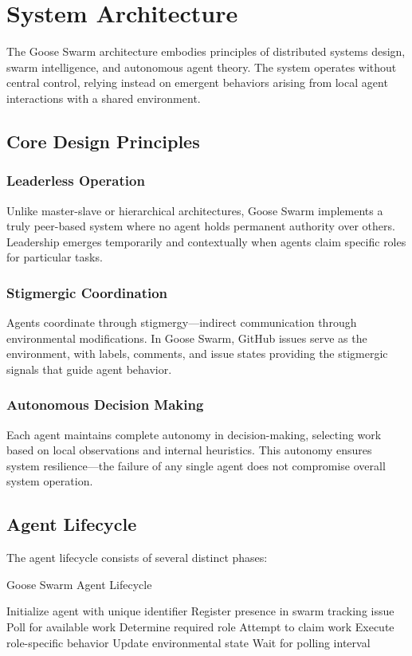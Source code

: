 \documentclass[11pt,a4paper]{article}
\begin{document}
\section{System Architecture}

The Goose Swarm architecture embodies principles of distributed systems design, swarm intelligence, and autonomous agent theory. The system operates without central control, relying instead on emergent behaviors arising from local agent interactions with a shared environment.

\subsection{Core Design Principles}

\subsubsection{Leaderless Operation}
Unlike master-slave or hierarchical architectures, Goose Swarm implements a truly peer-based system where no agent holds permanent authority over others. Leadership emerges temporarily and contextually when agents claim specific roles for particular tasks.

\subsubsection{Stigmergic Coordination}
Agents coordinate through stigmergy—indirect communication through environmental modifications. In Goose Swarm, GitHub issues serve as the environment, with labels, comments, and issue states providing the stigmergic signals that guide agent behavior.

\subsubsection{Autonomous Decision Making}
Each agent maintains complete autonomy in decision-making, selecting work based on local observations and internal heuristics. This autonomy ensures system resilience—the failure of any single agent does not compromise overall system operation.

\subsection{Agent Lifecycle}

The agent lifecycle consists of several distinct phases:

\begin{algorithm}
\caption{Goose Swarm Agent Lifecycle}
\begin{algorithmic}[1]
\STATE Initialize agent with unique identifier
\STATE Register presence in swarm tracking issue
    \STATE Poll for available work
        \STATE Determine required role
        \STATE Attempt to claim work
            \STATE Execute role-specific behavior
            \STATE Update environmental state
        \ENDIF
    \ELSE
        \STATE Wait for polling interval
    \ENDIF
\ENDWHILE
\end{algorithmic}
\end{algorithm}
\end{document}
